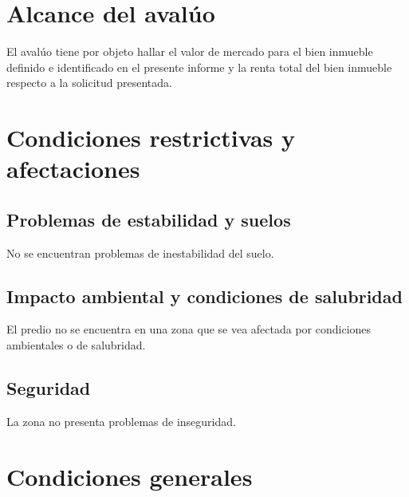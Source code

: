 \documentclass[12pt,a4paper,twoside]{article}
\begin{document}
\section{Alcance del avalúo}

El avalúo tiene por objeto hallar el valor de mercado para el bien inmueble definido e identificado en el presente informe y la renta total del bien inmueble respecto a la solicitud presentada.

\section{Condiciones restrictivas y afectaciones}

\subsection{Problemas de estabilidad y suelos}

No se encuentran problemas de inestabilidad del suelo.

\subsection{Impacto ambiental y condiciones de salubridad}

El predio no se encuentra en una zona que se vea afectada por condiciones ambientales o de salubridad.



\subsection{Seguridad}

La zona no presenta problemas de inseguridad.

\section{Condiciones generales}
\end{document}
